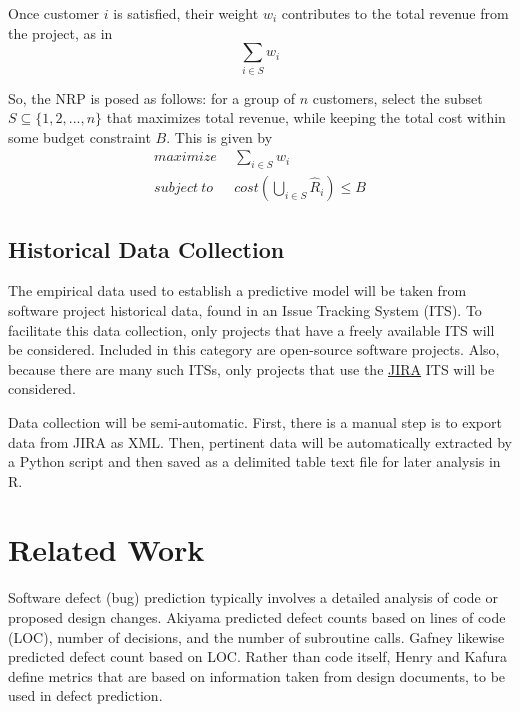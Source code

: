 \documentclass[a4paper]{scrartcl}
\begin{document}
Once customer $i$ is satisfied, their weight $w_i$ contributes to the total revenue from the project, as in
\begin{equation}
\sum_{i \in S} w_i
\end{equation}

So, the NRP is posed as follows: for a group of $n$ customers, select the subset $S \subseteq \{ 1,2,...,n \}$ that maximizes total revenue, while keeping the total cost within some budget constraint $B$. This is given by 
\begin{equation}
\begin{split}
maximize~~& \sum_{i \in S} w_i \\
subject~to~~~& cost(\bigcup_{i \in S} \hat{R}_i) \le B
\end{split}
\end{equation}

\subsection{Historical Data Collection}
The empirical data used to establish a predictive model will be taken from software project historical data, found in an Issue Tracking System (ITS). To facilitate this data collection, only projects that have a freely available ITS will be considered. Included in this category are open-source software projects. Also, because there are many such ITSs, only projects that use the \href{https://www.atlassian.com/software/jira}{JIRA} ITS will be considered.

Data collection will be semi-automatic. First, there is a manual step is to export data from JIRA as XML. Then, pertinent data will be automatically extracted by a Python script and then saved as a delimited table text file for later analysis in R.

\section{Related Work}
\label{sec:related_work}

Software defect (bug) prediction typically involves a detailed analysis of code or proposed design changes. Akiyama \cite{1971_akiyama} predicted defect counts based on lines of code (LOC), number of decisions, and the number of subroutine calls. Gafney \cite{1984_gaffney_estimating} likewise predicted defect count based on LOC. Rather than code itself, Henry and Kafura \cite{1984_henry_evaluation} define metrics that are based on information taken from design documents, to be used in defect prediction.
\end{document}

